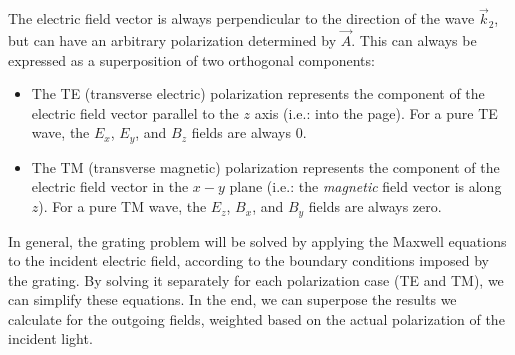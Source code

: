 The electric field vector is always perpendicular to the direction of the wave $\vec k_2$, but can have an arbitrary polarization determined by $\vec A$.  This can always be expressed as a superposition of two orthogonal components:
\begin{itemize}
\item The TE (transverse electric) polarization represents the component of the electric field vector parallel to the $z$ axis (i.e.: into the page).  For a pure TE wave, the $E_x$, $E_y$, and $B_z$ fields are always 0.
\item The TM (transverse magnetic) polarization represents the component of the electric field vector in the $x-y$ plane (i.e.: the \emph{magnetic} field vector is along $z$).  For a pure TM wave, the $E_z$, $B_x$, and $B_y$ fields are always zero.
\end{itemize}
In general, the grating problem will be solved by applying the Maxwell equations to the incident electric field, according to the boundary conditions imposed by the grating.  By solving it separately for each polarization case (TE and TM), we can simplify these equations.  In the end, we can superpose the results we calculate for the outgoing fields, weighted based on the actual polarization of the incident light.

